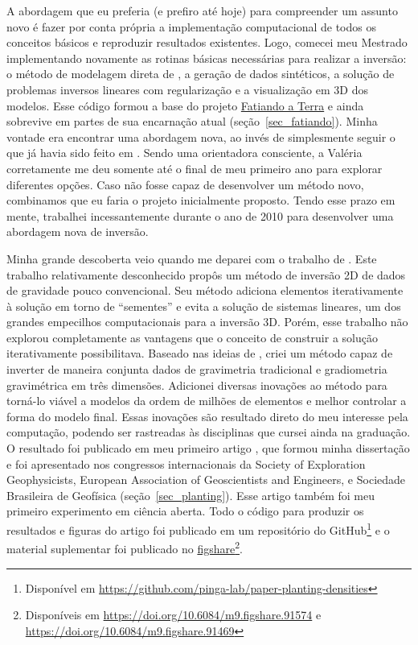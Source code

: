 \documentclass[12pt,a4paper,oneside]{book}
\begin{document}
A abordagem que eu preferia (e prefiro até hoje) para compreender um assunto
novo é fazer por conta própria a implementação computacional de todos os
conceitos básicos e reproduzir resultados existentes.
Logo, comecei meu Mestrado implementando novamente as rotinas básicas
necessárias para realizar a inversão: o método de modelagem direta de
\citet{Nagy2000}, a geração de dados sintéticos, a solução de problemas
inversos lineares com regularização e a visualização em 3D dos modelos.
Esse código formou a base do projeto
\href{https://www.fatiando.org}{Fatiando a Terra} e ainda sobrevive em partes
de sua encarnação atual (seção~\ref{sec_fatiando}).
Minha vontade era encontrar uma abordagem nova, ao invés de simplesmente seguir
o que já havia sido feito em \citet{SilvaDias2009}.
Sendo uma orientadora consciente, a Valéria corretamente me deu somente até o
final de meu primeiro ano para explorar diferentes opções.
Caso não fosse capaz de desenvolver um método novo, combinamos que eu faria o
projeto inicialmente proposto.
Tendo esse prazo em mente, trabalhei incessantemente durante o ano de 2010 para
desenvolver uma abordagem nova de inversão.

Minha grande descoberta veio quando me deparei com o trabalho de
\citet{Rene1986}.
Este trabalho relativamente desconhecido propôs um método de inversão 2D de
dados de gravidade pouco convencional.
Seu método adiciona elementos iterativamente à solução em torno de ``sementes''
e evita a solução de sistemas lineares, um dos grandes empecilhos
computacionais para a inversão 3D.
Porém, esse trabalho não explorou completamente as vantagens que o conceito de
construir a solução iterativamente possibilitava.
Baseado nas ideias de \citet{Rene1986}, criei um método capaz de inverter de
maneira conjunta dados de gravimetria tradicional e gradiometria gravimétrica
em três dimensões.
Adicionei diversas inovações ao método para torná-lo viável a modelos da ordem
de milhões de elementos e melhor controlar a forma do modelo final.
Essas inovações são resultado direto do meu interesse pela computação, podendo
ser rastreadas às disciplinas que cursei ainda na graduação.
O resultado foi publicado em meu primeiro artigo \citep{Uieda2012}, que formou minha
dissertação e foi apresentado nos congressos internacionais da
Society of Exploration Geophysicists,
European Association of Geoscientists and Engineers,
e Sociedade Brasileira de Geofísica
(seção~\ref{sec_planting}).
Esse artigo também foi meu primeiro experimento em ciência aberta.
Todo o código para produzir os resultados e figuras do artigo foi publicado
em um repositório do GitHub\footnote{Disponível em
\url{https://github.com/pinga-lab/paper-planting-densities}} e o material
suplementar foi publicado no
\href{https://figshare.com/}{figshare}\footnote{Disponíveis em
\url{https://doi.org/10.6084/m9.figshare.91574} e
\url{https://doi.org/10.6084/m9.figshare.91469}}.
\end{document}
